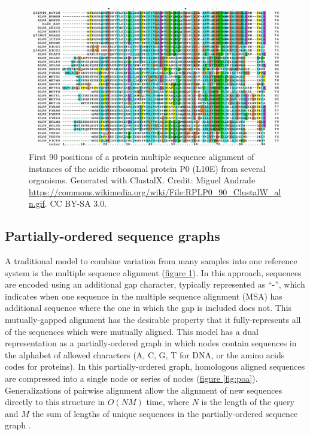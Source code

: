 \documentclass{article}
\begin{document}
\begin{figure}[h!]
\centering
\includegraphics[width=1.0\textwidth]{figures/RPLP0_90_ClustalW_aln}
\caption{\label{fig:msa}
  First 90 positions of a protein multiple sequence alignment of instances of the acidic ribosomal protein P0 (L10E) from several organisms. Generated with ClustalX. Credit: Miguel Andrade \url{https://commons.wikimedia.org/wiki/File:RPLP0_90_ClustalW_aln.gif}. CC BY-SA 3.0.
}
\end{figure}

\subsection{Partially-ordered sequence graphs}

A traditional model to combine variation from many samples into one reference system is the multiple sequence alignment (\hyperref[fig:msa]{figure \ref{fig:msa}}). In this approach, sequences are encoded using an additional gap character, typically represented as ``-'', which indicates when one sequence in the multiple sequence alignment (MSA) has additional sequence where the one in which the gap is included does not. This mutually-gapped alignment has the desirable property that it fully-represents all of the sequences which were mutually aligned. This model has a dual representation as a partially-ordered graph in which nodes contain sequences in the alphabet of allowed characters (A, C, G, T for DNA, or the amino acids codes for proteins). In this partially-ordered graph, homologous aligned sequences are compressed into a single node or series of nodes (\hyperref[fig:poa]{figure \ref{fig:poa}}). Generalizations of pairwise alignment \cite{gotoh1982} allow the alignment of new sequences directly to this structure in $O(NM)$ time, where $N$ is the length of the query and $M$ the sum of lengths of unique sequences in the partially-ordered sequence graph \cite{lee2002POA}.
\end{document}
